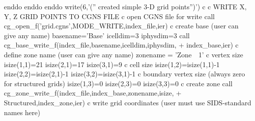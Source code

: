 \documentclass[12pt]{article}
\begin{document}
{\newline\indent\indent\indent          enddo
\newline\indent\indent        enddo
\newline\indent      enddo
\newline\indent      write(6,'('' created simple 3-D grid points'')')
\newline c
\newline c  WRITE X, Y, Z GRID POINTS TO CGNS FILE
\newline c  open CGNS file for write
\newline\indent      call cg\_open\_f('grid.cgns',MODE\_WRITE,index\_file,ier)
\newline c  create base (user can give any name)
\newline\indent      basename='Base'
\newline\indent      icelldim=3
\newline\indent      iphysdim=3
\newline\indent      call cg\_base\_write\_f(index\_file,basename,icelldim,iphysdim,
\newline + \indent index\_base,ier)
\newline c  define zone name (user can give any name)
\newline\indent      zonename = 'Zone~~1'
\newline c  vertex size
\newline\indent      isize(1,1)=21
\newline\indent      isize(2,1)=17
\newline\indent      isize(3,1)=9
\newline c  cell size
\newline\indent      isize(1,2)=isize(1,1)-1
\newline\indent      isize(2,2)=isize(2,1)-1
\newline\indent      isize(3,2)=isize(3,1)-1
\newline c  boundary vertex size (always zero for structured grids)
\newline\indent      isize(1,3)=0
\newline\indent      isize(2,3)=0
\newline\indent      isize(3,3)=0
\newline c  create zone
\newline\indent      call cg\_zone\_write\_f(index\_file,index\_base,zonename,isize,
\newline + \indent Structured,index\_zone,ier)
\newline c  write grid coordinates (user must use SIDS-standard names here)
}
\end{document}
